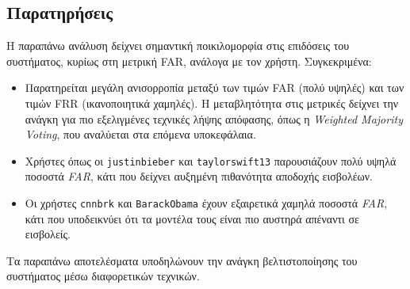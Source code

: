 \subsection{Παρατηρήσεις}
Η παραπάνω ανάλυση δείχνει σημαντική ποικιλομορφία στις επιδόσεις του συστήματος, κυρίως στη μετρική FAR, ανάλογα με τον χρήστη. Συγκεκριμένα:
\begin{itemize}
    \item Παρατηρείται μεγάλη ανισορροπία μεταξύ των τιμών FAR (πολύ υψηλές) και των τιμών FRR (ικανοποιητικά χαμηλές). Η μεταβλητότητα στις μετρικές δείχνει την ανάγκη για πιο εξελιγμένες τεχνικές λήψης απόφασης, όπως η \emph{Weighted Majority Voting}, που αναλύεται στα επόμενα υποκεφάλαια.
    \item Χρήστες όπως οι \texttt{justinbieber} και \texttt{taylorswift13} παρουσιάζουν πολύ υψηλά ποσοστά \emph{FAR}, κάτι που δείχνει αυξημένη πιθανότητα αποδοχής εισβολέων.
    \item Οι χρήστες \texttt{cnnbrk} και \texttt{BarackObama} έχουν εξαιρετικά χαμηλά ποσοστά \emph{FAR}, κάτι που υποδεικνύει ότι τα μοντέλα τους είναι πιο αυστηρά απέναντι σε εισβολείς.
\end{itemize}

Τα παραπάνω αποτελέσματα υποδηλώνουν την ανάγκη βελτιστοποίησης του συστήματος μέσω διαφορετικών τεχνικών.